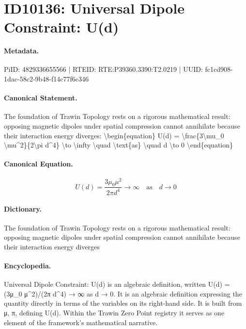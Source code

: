 \section*{ID10136: Universal Dipole Constraint: U(d)}
\paragraph{Metadata.}
PiID: 4829336655566 | RTEID: RTE:P39360.3390:T2.0219 | UUID: fc1cd908-1dac-58c2-9b48-f14c77f6c346

\paragraph{Canonical Statement.}
The foundation of Trawin Topology rests on a rigorous mathematical result: opposing magnetic dipoles under spatial compression cannot annihilate because their interaction energy diverges: \textbackslash{}begin\{equation\} U(d) = \textbackslash{}frac\{3\textbackslash{}mu\_0 \textbackslash{}mu\textasciicircum{}2\}\{2\textbackslash{}pi d\textasciicircum{}4\} \textbackslash{}to \textbackslash{}infty \textbackslash{}quad \textbackslash{}text\{as\} \textbackslash{}quad d \textbackslash{}to 0 \textbackslash{}end\{equation\}

\paragraph{Canonical Equation.}
\[
U(d) = \frac{3\mu_0 \mu^2}{2\pi d^4} \to \infty \quad \text{as} \quad d \to 0
\]

\paragraph{Dictionary.}
The foundation of Trawin Topology rests on a rigorous mathematical result: opposing magnetic dipoles under spatial compression cannot annihilate because their interaction energy diverges

\paragraph{Encyclopedia.}
Universal Dipole Constraint: U(d) is an algebraic definition, written U(d) = (3μ\_0 μ\textasciicircum{}2)/(2π d\textasciicircum{}4) → ∞ as d → 0. It is an algebraic definition expressing the quantity directly in terms of the variables on its right-hand side. It is built from μ, π, defining U(d). Within the Trawin Zero Point registry it serves as one element of the framework's mathematical narrative.
